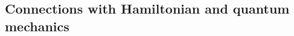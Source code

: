 \documentclass[orivec]{llncs}
\makeatletter
\newcommand{\emp}[1]{\textbf{#1}}
\newcommand{\vect}[1]{\boldsymbol{#1}}
\renewcommand{\boxed}[1]{\fbox{\m@th$\displaystyle\scalebox{0.9}{#1}$} \,}
\makeatother
\begin{document}

\subsection{Connections with Hamiltonian and quantum mechanics}
\label{sec:quantum}
\end{document}
